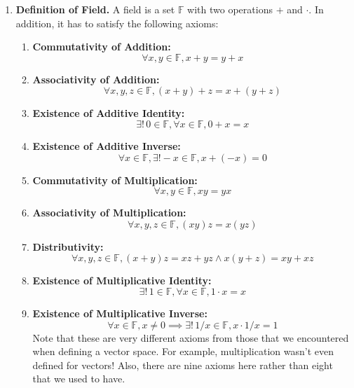 \documentclass[oneside, 12pt]{book}
\newcommand{\settag}[1]{\renewcommand{\theenumi}{#1}}
\newcommand{\tbf}[1]{\textbf{#1}}
\newcommand{\para}[1]{\item \tbf{#1}}
\begin{document}
\begin{enumerate}
    \settag{5.1.4}
    \para{Definition of Field.} A field is a set $\mathbb{F}$ with two operations $+$ and 
    $\cdot$. In addition, it has to satisfy the following axioms:
    \begin{enumerate}
        \item \textbf{Commutativity of Addition:} 
        \begin{equation*} 
            \forall x, y \in \mathbb{F}, x+y = y+x
        \end{equation*}
        \item \textbf{Associativity of Addition:} 
        \begin{equation*} 
            \forall x, y , z \in \mathbb{F}, (x+y)+z = x +(y+z)
        \end{equation*}
        \item \textbf{Existence of Additive Identity:} 
        \begin{equation*} 
            \exists!\, 0 \in \mathbb{F}, \forall x\in \mathbb{F}, 0+x = x
        \end{equation*}
        \item \textbf{Existence of Additive Inverse:} 
        \begin{equation*}
            \forall x \in \mathbb{F}, \exists! -x \in \mathbb{F}, x+(-x) = 0
        \end{equation*}
        \item \textbf{Commutativity of Multiplication:} 
        \begin{equation*}
            \forall x, y \in \mathbb{F}, xy = yx
        \end{equation*}
        \item \textbf{Associativity of Multiplication:} 
        \begin{equation*}
            \forall x,y,z \in \mathbb{F}, (xy)z = x(yz)
        \end{equation*}
        \item \textbf{Distributivity:}
        \begin{equation*} 
            \forall x,y,z \in \mathbb{F}, (x+y)z = xz+yz \land x(y+z) = xy+xz
        \end{equation*}
        \item \textbf{Existence of Multiplicative Identity:} 
        \begin{equation*} 
            \exists!\, 1\in \mathbb{F}, \forall x\in \mathbb{F}, 1\cdot x = x 
        \end{equation*}
        \item \textbf{Existence of Multiplicative Inverse:} 
        \begin{equation*}
            \forall x \in \mathbb{F}, x\neq 0\implies \exists!\,1/x \in \mathbb{F}, x \cdot 1/x = 1
        \end{equation*}
        Note that these are very different axioms from those that we encountered when defining 
        a vector space. For example, multiplication wasn't even defined for vectors! Also, there are nine axioms here rather than eight that we used to have.
    \end{enumerate}
    

\end{enumerate}
\end{document}
